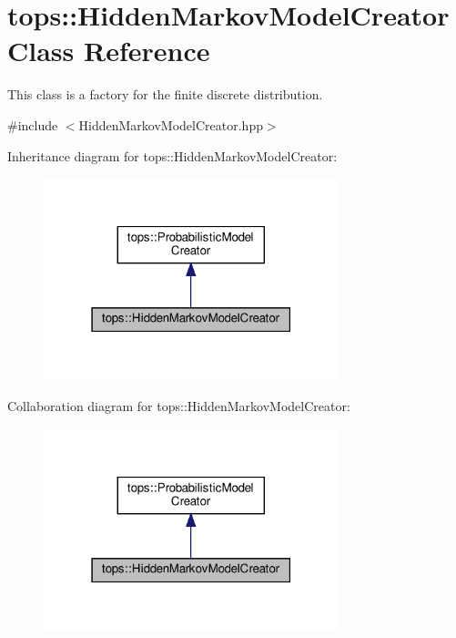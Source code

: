 \hypertarget{classtops_1_1HiddenMarkovModelCreator}{}\section{tops\+:\+:Hidden\+Markov\+Model\+Creator Class Reference}
\label{classtops_1_1HiddenMarkovModelCreator}


This class is a factory for the finite discrete distribution.  




{\ttfamily \#include $<$Hidden\+Markov\+Model\+Creator.\+hpp$>$}



Inheritance diagram for tops\+:\+:Hidden\+Markov\+Model\+Creator\+:
\nopagebreak
\begin{figure}[H]
\begin{center}
\leavevmode
\includegraphics[width=243pt]{classtops_1_1HiddenMarkovModelCreator__inherit__graph}
\end{center}
\end{figure}


Collaboration diagram for tops\+:\+:Hidden\+Markov\+Model\+Creator\+:
\nopagebreak
\begin{figure}[H]
\begin{center}
\leavevmode
\includegraphics[width=243pt]{classtops_1_1HiddenMarkovModelCreator__coll__graph}
\end{center}
\end{figure}
